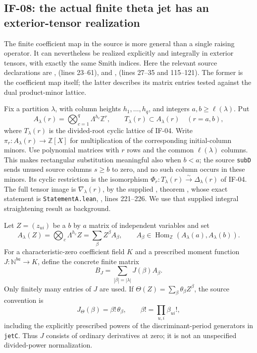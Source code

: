 \documentclass[11pt,a4paper]{article}
\theoremstyle{definition}
\theoremstyle{remark}
\begin{document}
\subsection{IF-08: the actual finite theta jet has an exterior-tensor realization}
The finite coefficient map in the source is more general than a single
raising operator. It can nevertheless be realized explicitly and
integrally in exterior tensors, with exactly the same Smith indices.
Here the relevant source declarations are
,
(lines 23--61), and
,
 (lines 27--35 and 115--121).
The former is the coefficient map itself; the latter describes its
matrix entries tested against the dual product-minor lattice.

Fix a partition $\lambda$, with column heights $h_1,\ldots,h_q$,
and integers $a,b\geq\ell(\lambda)$. Put
\[
 A_\lambda(r)=\bigotimes_{c=1}^q\Lambda^{h_c}\mathbb Z^r,
 \qquad T_\lambda(r)\subset A_\lambda(r)
 \quad (r=a,b),
\]
where $T_\lambda(r)$ is the divided-root cyclic lattice of IF-04.
Write $\pi_r:A_\lambda(r)\longrightarrow\mathbb Z[X]$ for
multiplication of the corresponding initial-column minors. Use polynomial
matrices with $r$ rows and the common $\ell(\lambda)$ columns. This
makes rectangular substitution meaningful also when $b<a$; the
source \texttt{subD} sends unused source columns $s\geq b$ to zero,
and no such column occurs in these minors. Its cyclic
restriction is the isomorphism
$\Phi_r:T_\lambda(r)\xrightarrow\sim\Delta_\lambda(r)$ of IF-04.
The full tensor image is $\nabla_\lambda(r)$, by the supplied
, theorem
, whose exact statement is
\texttt{StatementA.lean}, , lines 221--226.
We use that supplied integral straightening result as background.

Let $Z=(z_{ui})$ be a $b$ by $a$ matrix of independent variables and set
\[
 A_\lambda(Z)=\bigotimes_c\Lambda^{h_c}Z
       =\sum_\beta Z^\beta A_\beta,
 \qquad A_\beta\in\operatorname{Hom}_{\mathbb Z}
       (A_\lambda(a),A_\lambda(b)).
\]
For a characteristic-zero coefficient field $K$ and a prescribed moment
function $J:\mathbb N^{ba}\to K$, define the concrete finite matrix
\[
 B_J=\sum_{|\beta|=|\lambda|}J(\beta)A_\beta.       \tag{IF-08a}
\]
Only finitely many entries of $J$ are used. If
$\Theta(Z)=\sum_\beta\theta_\beta Z^\beta$, the source convention is
\[
 J_\Theta(\beta)=\beta!\,\theta_\beta,
 \qquad \beta!=\prod_{u,i}\beta_{ui}!,              \tag{IF-08b}
\]
including the explicitly prescribed powers of the discriminant-period
generators in \texttt{jetC}. Thus $J$ consists of ordinary derivatives
at zero; it is not an unspecified divided-power normalization.
\end{document}
